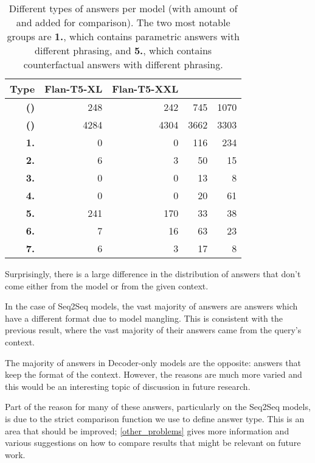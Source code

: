 \begin{table}[ht]
	\centering
	\footnotesize
	\begin{tabular}{>{\bfseries}r | r r r r}
		\toprule
			\bfseries Type & \ttfamily\scriptsize Flan-T5-XL & \ttfamily\scriptsize Flan-T5-XXL & \ttfamily\scriptsize \llamaparbox{} & \ttfamily\scriptsize \bigllamaparbox{} \\
		\midrule
			(\Parametric{}) & 248 & 242 & 745 & 1070 \\
			(\Contextual{}) & 4284 & 4304 & 3662 & 3303 \\
		\midrule
			1. & 0 & 0 & 116 & 234 \\
			2. & 6 & 3 & 50 & 15 \\
			3. & 0 & 0 & 13 & 8 \\
			4. & 0 & 0 & 20 & 61 \\
			5. & 241 & 170 & 33 & 38 \\
			6. & 7 & 16 & 63 & 23 \\
			7. & 6 & 3 & 17 & 8 \\
		\bottomrule
	\end{tabular}
	\caption{Different types of \Other{} answers per model (with amount of \Parametric{} and \Contextual{} added for comparison). The two most notable groups are \textbf{1.}, which contains parametric answers with different phrasing, and \textbf{5.}, which contains counterfactual answers with different phrasing.}
	\label{other_results_category}
\end{table}

Surprisingly, there is a large difference in the distribution of answers that don't come either from the model or from the given context.

In the case of Seq2Seq models, the vast majority of \Other{} answers are \Contextual{} answers which have a different format due to model mangling.
This is consistent with the previous result, where the vast majority of their answers came from the query's context.

The majority of \Other{} answers in Decoder-only models are the opposite: \Parametric{} answers that keep the format of the context.
However, the reasons are much more varied and this would be an interesting topic of discussion in future research.

Part of the reason for many of these answers, particularly on the Seq2Seq models, is due to the strict comparison function we use to define answer type.
This is an area that should be improved; \cref{other_problems} gives more information and various suggestions on how to compare results that might be relevant on future work.


